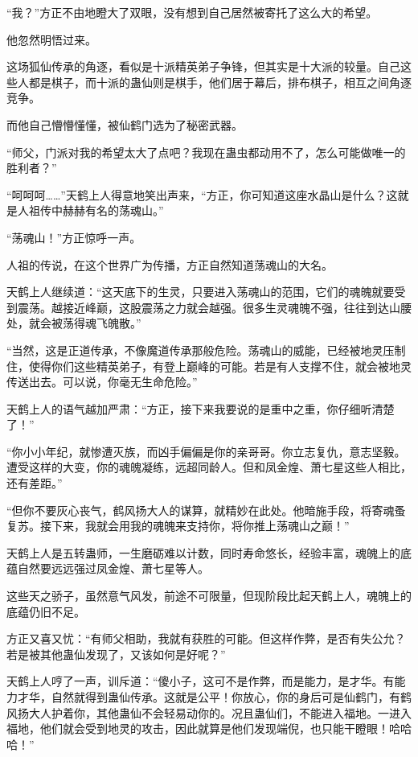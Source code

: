 \begin{this_body}
“我？”方正不由地瞪大了双眼，没有想到自己居然被寄托了这么大的希望。

他忽然明悟过来。

这场狐仙传承的角逐，看似是十派精英弟子争锋，但其实是十大派的较量。自己这些人都是棋子，而十派的蛊仙则是棋手，他们居于幕后，排布棋子，相互之间角逐竞争。

而他自己懵懵懂懂，被仙鹤门选为了秘密武器。

“师父，门派对我的希望太大了点吧？我现在蛊虫都动用不了，怎么可能做唯一的胜利者？”

“呵呵呵……”天鹤上人得意地笑出声来，“方正，你可知道这座水晶山是什么？这就是人祖传中赫赫有名的荡魂山。”

“荡魂山！”方正惊呼一声。

人祖的传说，在这个世界广为传播，方正自然知道荡魂山的大名。

天鹤上人继续道：“这天底下的生灵，只要进入荡魂山的范围，它们的魂魄就要受到震荡。越接近峰巅，这股震荡之力就会越强。很多生灵魂魄不强，往往到达山腰处，就会被荡得魂飞魄散。”

“当然，这是正道传承，不像魔道传承那般危险。荡魂山的威能，已经被地灵压制住，使得你们这些精英弟子，有登上巅峰的可能。若是有人支撑不住，就会被地灵传送出去。可以说，你毫无生命危险。”

天鹤上人的语气越加严肃：“方正，接下来我要说的是重中之重，你仔细听清楚了！”

“你小小年纪，就惨遭灭族，而凶手偏偏是你的亲哥哥。你立志复仇，意志坚毅。遭受这样的大变，你的魂魄凝练，远超同龄人。但和凤金煌、萧七星这些人相比，还有差距。”

“但你不要灰心丧气，鹤风扬大人的谋算，就精妙在此处。他暗施手段，将寄魂蚤复苏。接下来，我就会用我的魂魄来支持你，将你推上荡魂山之巅！”

天鹤上人是五转蛊师，一生磨砺难以计数，同时寿命悠长，经验丰富，魂魄上的底蕴自然要远远强过凤金煌、萧七星等人。

这些天之骄子，虽然意气风发，前途不可限量，但现阶段比起天鹤上人，魂魄上的底蕴仍旧不足。

方正又喜又忧：“有师父相助，我就有获胜的可能。但这样作弊，是否有失公允？若是被其他蛊仙发现了，又该如何是好呢？”

天鹤上人哼了一声，训斥道：“傻小子，这可不是作弊，而是能力，是才华。有能力才华，自然就得到蛊仙传承。这就是公平！你放心，你的身后可是仙鹤门，有鹤风扬大人护着你，其他蛊仙不会轻易动你的。况且蛊仙们，不能进入福地。一进入福地，他们就会受到地灵的攻击，因此就算是他们发现端倪，也只能干瞪眼！哈哈哈！”


\end{this_body}

